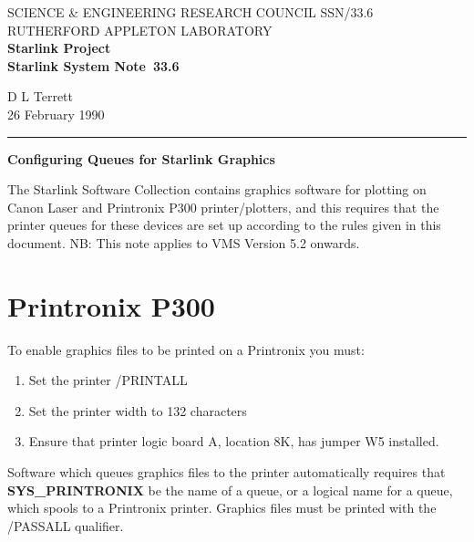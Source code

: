 \pagestyle{myheadings}

\newcommand{\stardoccategory}  {Starlink System Note}
\newcommand{\stardocinitials}  {SSN}
\newcommand{\stardocnumber}    {33.6}
\newcommand{\stardocauthors}   {D L Terrett}
\newcommand{\stardocdate}      {26 February 1990}
\newcommand{\stardoctitle}     {Configuring Queues for Starlink Graphics}

\newcommand{\stardocname}{\stardocinitials /\stardocnumber}
\markright{\stardocname}
\setlength{\textwidth}{160mm}
\setlength{\textheight}{240mm}
\setlength{\topmargin}{-5mm}
\setlength{\oddsidemargin}{0mm}
\setlength{\evensidemargin}{0mm}
\setlength{\parindent}{0mm}
\setlength{\parskip}{\medskipamount}
\setlength{\unitlength}{1mm}


\thispagestyle{empty}
SCIENCE \& ENGINEERING RESEARCH COUNCIL \hfill \stardocname\\
RUTHERFORD APPLETON LABORATORY\\
{\large\bf Starlink Project\\}
{\large\bf \stardoccategory\ \stardocnumber}
\begin{flushright}
\stardocauthors\\
\stardocdate
\end{flushright}
\vspace{-4mm}
\rule{\textwidth}{0.5mm}
\vspace{5mm}
\begin{center}
{\Large\bf \stardoctitle}
\end{center}
\vspace{5mm}

The Starlink Software Collection contains graphics software for plotting on
Canon Laser and Printronix P300 printer/plotters, and this requires that the
printer queues for these devices are set up according to the rules given in
this document.
NB: This note applies to VMS Version 5.2 onwards.

\section{Printronix P300}

To enable graphics files to be printed on a Printronix you must:
\begin{enumerate}
\item Set the printer /PRINTALL
\item Set the printer width to 132 characters
\item Ensure that printer logic board A, location 8K, has jumper W5 installed.
\end{enumerate}
Software which queues graphics files to the printer automatically
requires that {\bf SYS\_PRINTRONIX} be the name of a queue, or a logical name
for a queue, which spools to a Printronix printer.
Graphics files must be printed with the /PASSALL qualifier.

